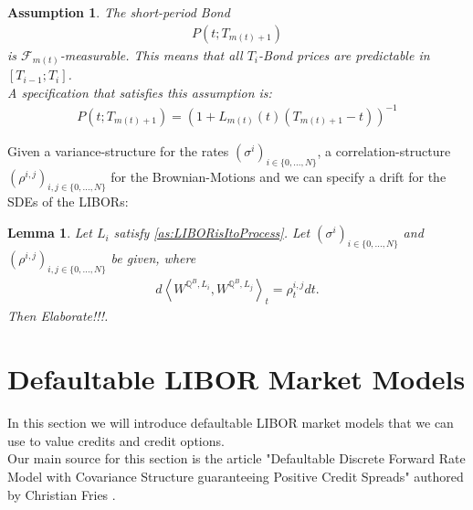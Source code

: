 \documentclass[12pt]{article}
\newtheorem{assumption}{Assumption}[section]
\newtheorem{lemma}[theorem]{Lemma}
\begin{document}
	\begin{assumption}\label{as:LMMShortPeriodBond}
		The short-period Bond
		\begin{align*}
			P(t;T_{m(t)+1})
		\end{align*}
		is $\mathcal{F}_{m(t)}$-measurable. This means that all $T_i$-Bond prices are predictable in $[T_{i-1};T_i]$.\\
		A specification that satisfies this assumption is:
		\begin{align*}
			P(t;T_{m(t)+1}) = (1 + L_{m(t)}(t)(T_{m(t)+1} - t))^{-1}
		\end{align*}
	\end{assumption}
	Given a variance-structure for the rates $(\sigma^i)_{i\in\{0,...,N\}}$, a correlation-structure $(\rho^{i,j})_{i,j \in \{0,...,N\}}$ for the Brownian-Motions and 
	we can specify a drift for the SDEs of the LIBORs:
	\begin{lemma}
		Let $L_i$ satisfy \cref{as:LIBORisItoProcess}. Let $(\sigma^i)_{i\in\{0,...,N\}}$ and $(\rho^{i,j})_{i,j \in \{0,...,N\}}$ be given, where
		\begin{align*}
			d\left\langle W^{\mathbb{Q}^B, L_i}, W^{\mathbb{Q}^B, L_j} \right\rangle_t = \rho^{i,j}_t dt.
		\end{align*}
		Then  \color{red}Elaborate!!!\color{black}. 
		
	\end{lemma}
	
	
	
	
	
	\pagebreak
	\section{Defaultable LIBOR Market Models}
	In this section we will introduce defaultable LIBOR market models that we can use to value credits and credit options.\\
	Our main source for this section is the article "Defaultable Discrete Forward Rate Model with Covariance Structure guaranteeing Positive Credit Spreads" authored by Christian Fries \cite{FriesDLMM}.
\end{document}
